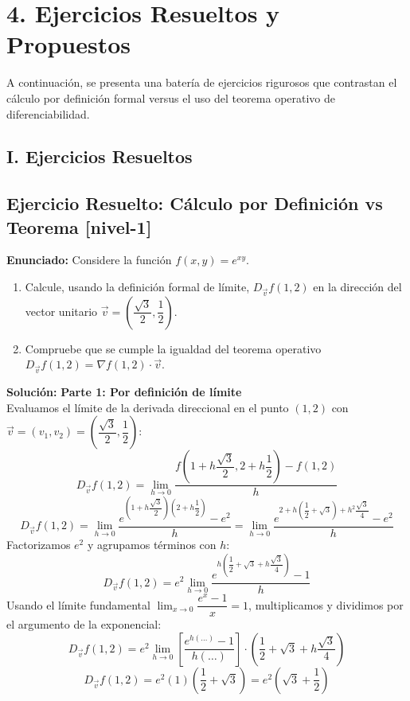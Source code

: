 \documentclass[11pt]{article}
\newenvironment{ejercicios}{%
  \section*{4. Ejercicios Resueltos y Propuestos}%
}{}
\newenvironment{ejercicioresuelto}[2]{\subsection*{Ejercicio Resuelto: #1 \small{[#2]}}}{}
\newcommand{\enunciado}[1]{\textbf{Enunciado:} #1\par\vspace{0.2cm}}
\newcommand{\solucion}[1]{\textbf{Solución:} #1\par\vspace{0.4cm}}
\begin{document}
\begin{ejercicios}
  A continuación, se presenta una batería de ejercicios rigurosos que contrastan el cálculo por definición formal versus el uso del teorema operativo de diferenciabilidad.

  \subsection*{I. Ejercicios Resueltos}

  \begin{ejercicioresuelto}{Cálculo por Definición vs Teorema}{nivel-1}
    \enunciado{
      Considere la función $\displaystyle f(x,y) = e^{xy}$.
      \begin{enumerate}
        \item Calcule, usando la definición formal de límite, $D_{\vec{v}} f(1,2)$ en la dirección del vector unitario $\displaystyle \vec{v} = \left(\dfrac{\sqrt{3}}{2} ,\dfrac{1}{2}\right)$.
        \item Compruebe que se cumple la igualdad del teorema operativo $\displaystyle D_{\vec{v}} f(1,2) = \nabla f(1,2) \cdot \vec{v}$.
      \end{enumerate}
    }
    \solucion{
      \textbf{Parte 1: Por definición de límite} \\
      Evaluamos el límite de la derivada direccional en el punto $(1,2)$ con $\vec{v} = (v_1, v_2) = (\dfrac{\sqrt{3}}{2}, \dfrac{1}{2})$:
      $$ D_{\vec{v}} f(1,2) = \lim\limits_{h \to 0} \dfrac{f\left(1 + h\dfrac{\sqrt{3}}{2}, 2 + h\dfrac{1}{2}\right) - f(1,2)}{h} $$
      $$ D_{\vec{v}} f(1,2) = \lim\limits_{h \to 0} \dfrac{e^{\left(1 + h\dfrac{\sqrt{3}}{2}\right)\left(2 + h\dfrac{1}{2}\right)} - e^2}{h} = \lim\limits_{h \to 0} \dfrac{e^{2 + h\left(\dfrac{1}{2} + \sqrt{3}\right) + h^2\dfrac{\sqrt{3}}{4}} - e^2}{h} $$
      Factorizamos $e^2$ y agrupamos términos con $h$:
      $$ D_{\vec{v}} f(1,2) = e^2 \lim\limits_{h \to 0} \dfrac{e^{h\left(\dfrac{1}{2} + \sqrt{3} + h\dfrac{\sqrt{3}}{4}\right)} - 1}{h} $$
      Usando el límite fundamental $\lim_{x\to 0} \dfrac{e^x - 1}{x} = 1$, multiplicamos y dividimos por el argumento de la exponencial:
      $$ D_{\vec{v}} f(1,2) = e^2 \lim\limits_{h \to 0} \left[ \dfrac{e^{h(\dots)} - 1}{h(\dots)} \right] \cdot \left(\dfrac{1}{2} + \sqrt{3} + h\dfrac{\sqrt{3}}{4}\right) $$
      $$ D_{\vec{v}} f(1,2) = e^2 (1) \left(\dfrac{1}{2} + \sqrt{3}\right) = e^2 \left( \sqrt{3} + \dfrac{1}{2} \right) $$

}
\end{ejercicioresuelto}
\end{ejercicios}
\end{document}
